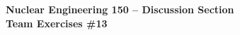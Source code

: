 \documentclass{report}
\begin{document}
\begin{center}
\textbf{\large Nuclear Engineering 150 -- Discussion Section}\\ 
\textbf{Team Exercises \#13}
\end{center}


\newpage


\end{document}
